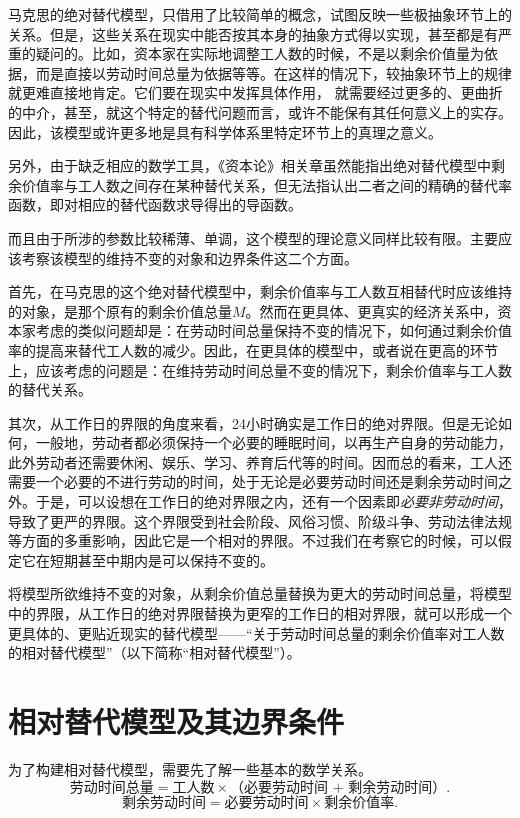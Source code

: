 \documentclass[a4paper,11pt]{ctexart}
\begin{document}
马克思的绝对替代模型，只借用了比较简单的概念，试图反映一些极抽象环节上的关系。但是，这些关系在现实中能否按其本身的抽象方式得以实现，甚至都是有严重的疑问的。比如，资本家在实际地调整工人数的时候，不是以剩余价值量为依据，而是直接以劳动时间总量为依据等等。在这样的情况下，较抽象环节上的规律就更难直接地肯定。它们要在现实中发挥具体作用， 就需要经过更多的、更曲折的中介，甚至，就这个特定的替代问题而言，或许不能保有其任何意义上的实存。因此，该模型或许更多地是具有科学体系里特定环节上的真理之意义。

另外，由于缺乏相应的数学工具，《资本论》相关章虽然能指出绝对替代模型中剩余价值率与工人数之间存在某种替代关系，但无法指认出二者之间的精确的替代率函数，即对相应的替代函数求导得出的导函数。

而且由于所涉的参数比较稀薄、单调，这个模型的理论意义同样比较有限。主要应该考察该模型的维持不变的对象和边界条件这二个方面。

首先，在马克思的这个绝对替代模型中，剩余价值率与工人数互相替代时应该维持的对象，是那个原有的剩余价值总量$M$。然而在更具体、更真实的经济关系中，资本家考虑的类似问题却是：在劳动时间总量保持不变的情况下，如何通过剩余价值率的提高来替代工人数的减少。因此，在更具体的模型中，或者说在更高的环节上，应该考虑的问题是：在维持劳动时间总量不变的情况下，剩余价值率与工人数的替代关系。

其次，从工作日的界限的角度来看，24小时确实是工作日的绝对界限。但是无论如何，一般地，劳动者都必须保持一个必要的睡眠时间，以再生产自身的劳动能力，此外劳动者还需要休闲、娱乐、学习、养育后代等的时间。因而总的看来，工人还需要一个必要的不进行劳动的时间，处于无论是必要劳动时间还是剩余劳动时间之外。于是，可以设想在工作日的绝对界限之内，还有一个因素即\textit{必要非劳动时间}，导致了更严的界限。这个界限受到社会阶段、风俗习惯、阶级斗争、劳动法律法规等方面的多重影响，因此它是一个相对的界限。不过我们在考察它的时候，可以假定它在短期甚至中期内是可以保持不变的。

将模型所欲维持不变的对象，从剩余价值总量替换为更大的劳动时间总量，将模型中的界限，从工作日的绝对界限替换为更窄的工作日的相对界限，就可以形成一个更具体的、更贴近现实的替代模型——“关于劳动时间总量的剩余价值率对工人数的相对替代模型”（以下简称“相对替代模型”）。

\section{相对替代模型及其边界条件}

为了构建相对替代模型，需要先了解一些基本的数学关系。
$$\mbox{劳动时间总量} = \mbox{工人数} \times\mbox{（必要劳动时间 + 剩余劳动时间）.}$$
$$\mbox{剩余劳动时间} = \mbox{必要劳动时间} \times \mbox{剩余价值率}.$$
\end{document}
